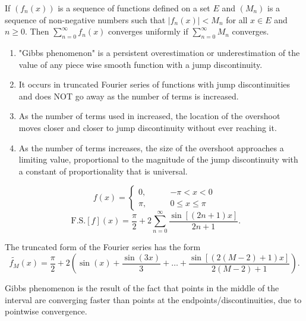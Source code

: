 \documentclass[class=article,crop=false]{standalone}
\begin{document}
\begin{eg}[]
\begin{thm}
	If $ (f_n(x))$ is a sequence of functions defined on a set $ E$ and  $ (M_n)$ is a sequence of non-negative numbers such that $ |f_n(x)|<M_n$ for all $ x \in E$ and $ n\geq 0$. Then $ \sum_{ n= 0}^{\infty} f_n(x)$ converges uniformly if $ \sum_{ n= 0}^{\infty} M_n$ converges.
\end{thm}
\end{eg}

\begin{defn}
\begin{enumerate}[label=\alph*)]
	\item "Gibbs phenomenon" is a persistent overestimation or underestimation of the value of any piece wise smooth function with a jump discontinuity.
	\item It occurs in truncated Fourier series of functions with jump discontinuities and does NOT go away as the number of terms is increased.
	\item As the number of terms used in increased, the location of the overshoot moves closer and closer to jump discontinuity without ever reaching it.
	\item As the number of terms increases, the size of the overshoot approaches a limiting value, proportional to the magnitude of the jump discontinuity with a constant of proportionality that is universal.
\end{enumerate}
\end{defn}

\begin{eg}[]
\begin{equation*}
	f(x)=
\begin{cases}
	0, \qquad & -\pi<x<0\\
	\pi, \qquad &0\leq x \leq \pi
\end{cases}
\end{equation*}
\[
	\text{ F.S.} [ f]( x) = \frac{\pi}{2} + 2 \sum_{ n= 0}^{\infty} \frac{\sin[(2n+1)x]}{2n+1}
.\] 

The truncated form of the Fourier series has the form
\[
	\tilde{ f_M}( x) = \frac{\pi}{2} + 2\left( \sin(x) + \frac{\sin(3x)}{3} + \ldots + \frac{\sin[(2(M-2)+1)x]}{2(M-2)+1}\right)  
.\]

\end{eg}
\begin{intuition}
	Gibbs phenomenon is the result of the fact that points in the middle of the interval are converging faster than points at the endpoints/discontinuities, due to pointwise convergence.
\end{intuition}
\end{document}
